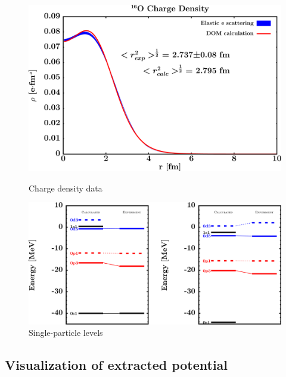 \begin{figure}[H]
    \centering
    \begin{minipage}{0.45\textwidth}
        \centering
        \includegraphics[width=1.0\textwidth]{figures/o16_chargeDensity.png}
        \caption{Charge density data}
        \label{DOMFitData_o16_chargeDensity}
    \end{minipage}\hfill
    \begin{minipage}{0.45\textwidth}
        \centering
        \includegraphics[width=1.0\textwidth]{figures/o16_SPLevels.png}
        \caption{Single-particle levels}
        \label{DOMFitData_o16_SPLevels}
    \end{minipage}
\end{figure}

\afterpage{\clearpage}

\subsection{Visualization of extracted potential}

